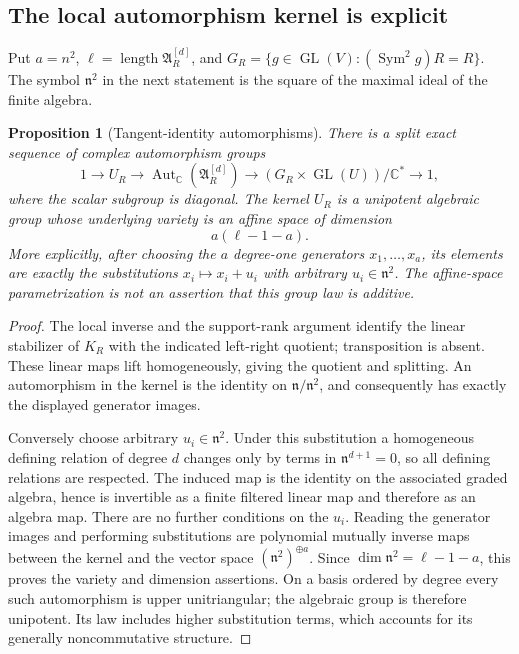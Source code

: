 \documentclass[11pt,reqno]{amsart}
\numberwithin{equation}{section}
\newtheorem{proposition}[theorem]{Proposition}
\theoremstyle{definition}\newtheorem{definition}[theorem]{Definition}
\theoremstyle{remark}\newtheorem{remark}[theorem]{Remark}
\newcommand{\C}{\mathbb C}\newcommand{\Q}{\mathbb Q}
\DeclareMathOperator{\Sym}{Sym}\DeclareMathOperator{\Gr}{Gr}
\DeclareMathOperator{\length}{length}
\begin{document}
\subsection{The local automorphism kernel is explicit}
Put \(a=n^2\), \(\ell=\length\mathfrak A_R^{[d]}\), and
\(G_R=\{g\in\operatorname{GL}(V):(\Sym^2g)R=R\}\).
The symbol \(\mathfrak n^2\) in the next statement is the square
of the maximal ideal of the finite algebra.

\begin{proposition}[Tangent-identity automorphisms]
\label{prop:local-automorphisms-v146}
There is a split exact sequence of complex automorphism groups
\begin{equation}\label{eq:local-aut-sequence-v146}
 1\longrightarrow U_R\longrightarrow
 \operatorname{Aut}_{\C}(\mathfrak A_R^{[d]})
 \longrightarrow (G_R\times\operatorname{GL}(U))/\C^*
 \longrightarrow1,
\end{equation}
where the scalar subgroup is diagonal.  The kernel \(U_R\) is a
unipotent algebraic group whose underlying variety is an affine
space of dimension
\[
                            a(\ell-1-a).
\]
More explicitly, after choosing the \(a\) degree-one generators
\(x_1,\ldots,x_a\), its elements are exactly the substitutions
\(x_i\mapsto x_i+u_i\) with arbitrary \(u_i\in\mathfrak n^2\).
The affine-space parametrization is not an assertion that this
group law is additive.
\end{proposition}
\begin{proof}
The local inverse and the support-rank argument identify the linear
stabilizer of \(K_R\) with the indicated left-right quotient;
transposition is absent.  These linear maps lift homogeneously,
giving the quotient and splitting.  An automorphism in the kernel
is the identity on \(\mathfrak n/\mathfrak n^2\), and consequently
has exactly the displayed generator images.

Conversely choose arbitrary \(u_i\in\mathfrak n^2\).  Under this
substitution a homogeneous defining relation of degree \(d\)
changes only by terms in \(\mathfrak n^{d+1}=0\), so all defining
relations are respected.  The induced map is the identity on the
associated graded algebra, hence is invertible as a finite filtered
linear map and therefore as an algebra map.  There are no further
conditions on the \(u_i\).  Reading the generator images and
performing substitutions are polynomial mutually inverse maps
between the kernel and the vector space
\((\mathfrak n^2)^{\oplus a}\).  Since
\(\dim\mathfrak n^2=\ell-1-a\), this proves the variety and
dimension assertions.  On a basis ordered by degree every such
automorphism is upper unitriangular; the algebraic group is
therefore unipotent.  Its law includes higher substitution terms,
which accounts for its generally noncommutative structure.
\end{proof}
\end{document}
